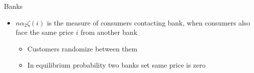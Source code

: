 \documentclass[10pt,english,slidetop,compress,
              blue,mathserif,color=option]{beamer}
\theoremstyle{plain}
\theoremstyle{definition}
\begin{document}
\begin{frame}[allowframebreaks]{Banks}
\begin{itemize}
      \begin{itemize}
        \item $n\alpha_{2}\zeta\left(i\right)$ is the measure of consumers contacting bank, when consumers also face the same price $i$ from another bank
        \begin{itemize}
        \item Customers randomize between them
        \item In equilibrium probability two banks set same price is zero
        \end{itemize}
      \end{itemize}
  \end{itemize}





\end{frame}
\end{document}
